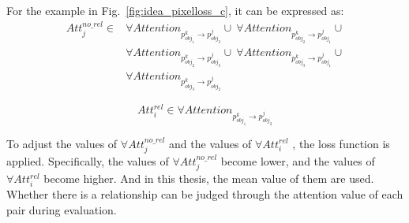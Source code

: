 For the example in Fig.~\ref{fig:idea_pixelloss_c}, it can be expressed as:
\begin{align*}
	Att_j^{no\_rel} \in & \forall Attention_{p^k_{obj_1} \to p^j_{obj_3}}  \cup \   \forall Attention_{p^k_{obj_2} \to p^j_{obj_1}} \cup \\ 
	& \forall Attention_{p^k_{obj_2} \to p^j_{obj_3}} \cup \ \forall Attention_{p^k_{obj_3} \to p^j_{obj_1}} \cup \\ 
	& \forall Attention_{p^k_{obj_3} \to p^j_{obj_2}}
\end{align*}

\begin{equation*}
	Att_i^{rel} \in  \forall Attention_{p^k_{obj_1} \to p^j_{obj_2}} 
\end{equation*}

To adjust the values of $ \forall Att_j^{no\_rel}  $ and the values of $ \forall Att_i^{rel} $ , the loss function is applied. Specifically, the values of $ \forall Att_j^{no\_rel}  $ become lower, and the values of $ \forall Att_i^{rel} $ become higher. And in this thesis, the mean value of them are used. Whether there is a relationship can be judged through the attention value of each pair during evaluation.

